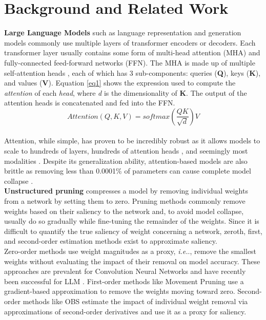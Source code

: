 \section{Background and Related Work}
\textbf{Large Language Models} such as language representation and generation models commonly use multiple layers of transformer encoders or decoders. Each transformer layer usually contains some form of multi-head attention (MHA) and fully-connected feed-forward networks (FFN). The MHA is made up of multiple self-attention heads \cite{Vaswani2017AttentionIA}, each of which has 3 sub-components: queries (\textbf{Q}), keys (\textbf{K}), and values (\textbf{V}). Equation \ref{eq1} shows the expression used to compute the \textit{attention} of each \textit{head}, where \textit{d} is the dimensionality of \textbf{K}. The output of the attention heads is concatenated and fed into the FFN. 
\begin{equation}
 Attention(Q,K,V) = \textit{softmax} \left(\frac{QK}{\sqrt{\textit{d}}}\right)V
  \label{eq1}
 \end{equation} \\
Attention, while simple, has proven to be incredibly robust as it allows models to scale to hundreds of layers, hundreds of attention heads \cite{Brown2020LanguageMA}, and seemingly most modalities \cite{Chen2021CrossViTCM} \cite{Arnab2021ViViTAV}. Despite its generalization ability, attention-based models are also brittle as removing less than 0.0001\% of parameters can cause complete model collapse \cite{Kovaleva2021BERTBO}.  \\
\textbf{Unstructured pruning} compresses a model by removing individual weights from a network by setting them to zero. Pruning methods commonly remove weights based on their saliency to the network and, to avoid model collapse, usually do so gradually while fine-tuning the remainder of the weights. Since it is difficult to quantify the true saliency of weight concerning a network, zeroth, first, and second-order estimation methods exist to approximate saliency.\\
Zero-order methods use weight magnitudes as a proxy,  \textit{i.e.}., remove the smallest weights without evaluating the impact of their removal on model accuracy. These approaches are prevalent for Convolution Neural Networks \cite{Han2015ADN} and have recently been successful for LLM \cite{Gordon2020CompressingBS} \cite{Chen2020TheLT} \cite{Zafrir2021PruneOF}. First-order methods like Movement Pruning \cite{Sanh2020MovementPA} use a gradient-based approximation to remove the weights moving toward zero. Second-order methods like OBS \cite{Singh2020WoodFisherES} estimate the impact of individual weight removal via approximations of second-order derivatives and use it as a proxy for saliency.\\
